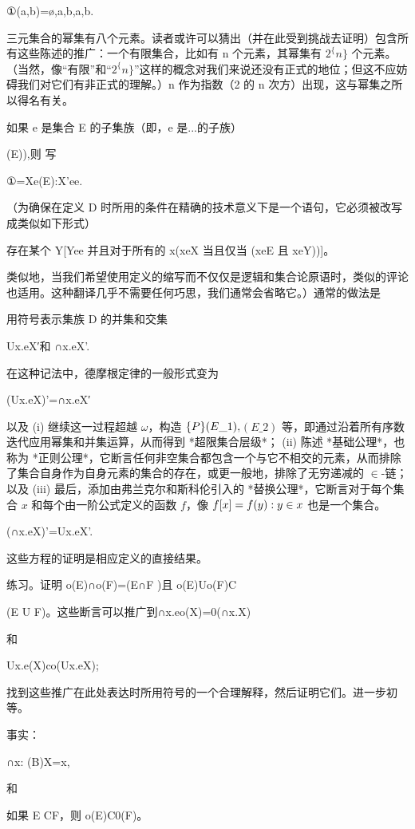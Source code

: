 \documentclass[12pt,a4paper]{ctexbook}
\theoremstyle{definition}
\theoremstyle{remark}
\begin{document}
①({a,b})={ø,{a},{b},{a,b}}.

三元集合的幂集有八个元素。读者或许可以猜出（并在此受到挑战去证明）包含所有这些陈述的推广：一个有限集合，比如有 n 个元素，其幂集有 $2^\{n\}$ 个元素。（当然，像“有限”和“$2^\{n\}$”这样的概念对我们来说还没有正式的地位；但这不应妨碍我们对它们有非正式的理解。）n 作为指数（2 的 n 次方）出现，这与幂集之所以得名有关。

如果 e 是集合 E 的子集族（即，e 是...的子族）

(E)),则 写

①={Xe(E):X'ee}.

（为确保在定义 D 时所用的条件在精确的技术意义下是一个语句，它必须被改写成类似如下形式）

存在某个 Y[Yee 并且对于所有的 x(xeX 当且仅当 (xeE 且 xeY))]。

类似地，当我们希望使用定义的缩写而不仅仅是逻辑和集合论原语时，类似的评论也适用。这种翻译几乎不需要任何巧思，我们通常会省略它。）通常的做法是

用符号表示集族 D 的并集和交集

Ux.eX′和 ∩x.eX'.

在这种记法中，德摩根定律的一般形式变为

(Ux.eX)'=∩x.eX′

以及 (i) 继续这一过程超越 $\omega$，构造 $\mathcal\{P\}(E\_1), $$(E\_2)$ 等，即通过沿着所有序数迭代应用幂集和并集运算，从而得到 *超限集合层级*； (ii) 陈述 *基础公理*，也称为 *正则公理*，它断言任何非空集合都包含一个与它不相交的元素，从而排除了集合自身作为自身元素的集合的存在，或更一般地，排除了无穷递减的 $\in$-链；以及 (iii) 最后，添加由弗兰克尔和斯科伦引入的 *替换公理*，它断言对于每个集合 $x$ 和每个由一阶公式定义的函数 $f$，像 $f[x] = \\{f(y) : y \in x\\}$ 也是一个集合。

(∩x.eX)'=Ux.eX'.

这些方程的证明是相应定义的直接结果。

练习。证明 o(E)∩o(F)=(E∩F )且 o(E)Uo(F)C

(E U F)。这些断言可以推广到∩x.eo(X)=0(∩x.X)

和

Ux.e(X)co(Ux.eX);

找到这些推广在此处表达时所用符号的一个合理解释，然后证明它们。进一步初等。

事实：

∩x: (B)X=x,

和

如果 E CF，则 o(E)C0(F)。
\end{document}
